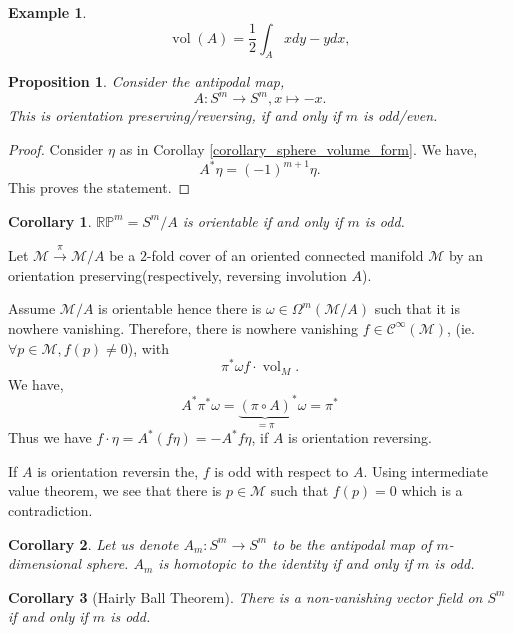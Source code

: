 \documentclass[10pt]{article}
\newtheorem{proposition}{Proposition}[section]
\newtheorem{corollary}{Corollary} [section]
\newtheorem{example}{Example}[section]
\DeclareMathOperator{\vol}{vol}
\newcommand{\R}[0]{\mathbb{R}}
\newcommand{\M}[0]{\mathcal{M}}
\newcommand{\cinf}[0]{\mathcal{C}^\infty}
\begin{document}
\begin{example}
  \begin{equation*}
  \vol(A) = {\frac 1 2}\int_A xdy-ydx, 
  \end{equation*}
\end{example}
\begin{proposition}
  Consider the antipodal map,
  \begin{equation*}
    A:S^m\to S^m, x\mapsto -x.
  \end{equation*}
This is orientation preserving/reversing, if and only if $m$ is odd/even.
\end{proposition}
\begin{proof}
  Consider $\eta$ as in Corollay \ref{corollary_sphere_volume_form}. We have,
  \begin{equation*}
    A^*\eta  = (-1)^{m+1}\eta.
  \end{equation*}
  This proves the statement.
\end{proof}
\begin{corollary}
  $\R\mathbb{P}^m = S^m/A$ is orientable if and only if $m$ is odd. 
\end{corollary}
Let $\M\stackrel{\pi}{\to}\M/A$ be a $2$-fold cover of an oriented connected manifold $\M$ by an orientation preserving(respectively, reversing involution $A$). 
\par Assume $\M/A$ is orientable hence there is $\omega\in\Omega^m(\M/A)$ such that it is nowhere vanishing. Therefore, there is nowhere vanishing $f\in\cinf(\M)$, (ie. $\forall p\in \M,f(p)\not=0$), with
\begin{equation*}
  \pi^*\omega f\cdot \vol_M.
\end{equation*}
We have,
\begin{equation*}
  A^*\pi^*\omega = {\underbrace{(\pi\circ A)}_{=\pi}}^*\omega = \pi^*
\end{equation*}
Thus we have $f\cdot\eta = A^*(f\eta)=-A^*f\eta$, if $A$ is orientation reversing.
\par If $A$ is orientation reversin the, $f$ is odd with respect to $A$. Using intermediate value theorem, we see that there is $p\in \M$ such that $f(p)=0$ which is a contradiction.
\begin{corollary}
  \label{lemma_antipodal_homotopic}
  Let us denote $A_m:S^m\to S^m$ to be the antipodal map of $m$-dimensional sphere. $A_m$ is homotopic to the identity if and only if $m$ is odd. 
\end{corollary}
\begin{corollary}[Hairly Ball Theorem]
  There is a non-vanishing vector field on $S^m$ if and only if $m$ is odd.
\end{corollary}
\end{document}
